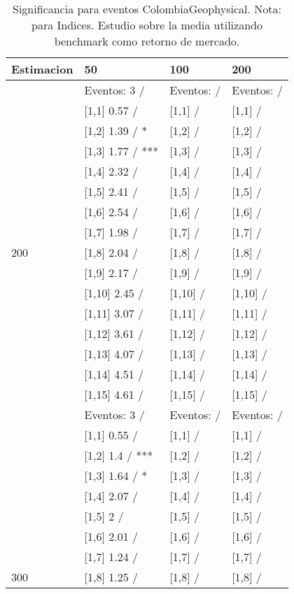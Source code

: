 \begin{table}

\caption{Significancia para eventos ColombiaGeophysical. Nota: para Indices. Estudio sobre la media utilizando benchmark como retorno de mercado.}
\centering
\begin{tabular}[t]{llll}
\toprule
Estimacion & 50 & 100 & 200\\
\midrule
 & Eventos:  3 / & Eventos:   / & Eventos:   /\\
 & {}[1,1] 0.57  / & {}[1,1]  / & {}[1,1]  /\\
 & {}[1,2] 1.39  / * & {}[1,2]  / & {}[1,2]  /\\
 & {}[1,3] 1.77  / *** & {}[1,3]  / & {}[1,3]  /\\
 & {}[1,4] 2.32  / & {}[1,4]  / & {}[1,4]  /\\
\addlinespace
 & {}[1,5] 2.41  / & {}[1,5]  / & {}[1,5]  /\\
 & {}[1,6] 2.54  / & {}[1,6]  / & {}[1,6]  /\\
 & {}[1,7] 1.98  / & {}[1,7]  / & {}[1,7]  /\\
200 & {}[1,8] 2.04  / & {}[1,8]  / & {}[1,8]  /\\
 & {}[1,9] 2.17  / & {}[1,9]  / & {}[1,9]  /\\
\addlinespace
 & {}[1,10] 2.45  / & {}[1,10]  / & {}[1,10]  /\\
 & {}[1,11] 3.07  / & {}[1,11]  / & {}[1,11]  /\\
 & {}[1,12] 3.61  / & {}[1,12]  / & {}[1,12]  /\\
 & {}[1,13] 4.07  / & {}[1,13]  / & {}[1,13]  /\\
 & {}[1,14] 4.51  / & {}[1,14]  / & {}[1,14]  /\\
\addlinespace
 & {}[1,15] 4.61  / & {}[1,15]  / & {}[1,15]  /\\
 & Eventos:  3 / & Eventos:   / & Eventos:   /\\
 & {}[1,1] 0.55  / & {}[1,1]  / & {}[1,1]  /\\
 & {}[1,2] 1.4  / *** & {}[1,2]  / & {}[1,2]  /\\
 & {}[1,3] 1.64  / * & {}[1,3]  / & {}[1,3]  /\\
\addlinespace
 & {}[1,4] 2.07  / & {}[1,4]  / & {}[1,4]  /\\
 & {}[1,5] 2  / & {}[1,5]  / & {}[1,5]  /\\
 & {}[1,6] 2.01  / & {}[1,6]  / & {}[1,6]  /\\
 & {}[1,7] 1.24  / & {}[1,7]  / & {}[1,7]  /\\
300 & {}[1,8] 1.25  / & {}[1,8]  / & {}[1,8]  /\\

\end{tabular}
\end{table}
